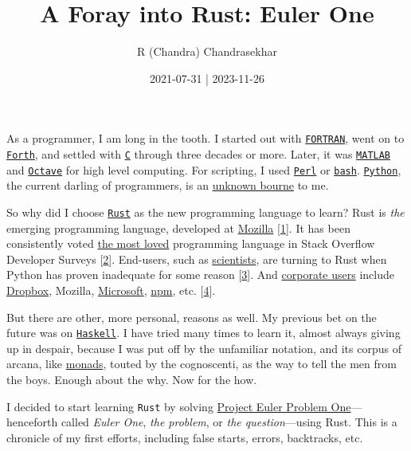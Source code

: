 \documentclass[
  a4paper,
]{article}
\title{A Foray into Rust: Euler One}
\author{R (Chandra) Chandrasekhar}
\date{2021-07-31 | 2023-11-26}
\begin{document}
\maketitle

\thispagestyle{empty}


As a programmer, I am long in the tooth. I started out with
\href{https://fortran-lang.org/}{\texttt{FORTRAN}}, went on to
\href{https://www.forth.com/}{\texttt{Forth}}, and settled with
\href{https://www.iso.org/standard/74528.html}{\texttt{C}} through three
decades or more. Later, it was
\href{https://www.mathworks.com/}{\texttt{MATLAB}} and
\href{https://www.gnu.org/software/octave/index}{\texttt{Octave}} for
high level computing. For scripting, I used
\href{https://www.perl.org/}{\texttt{Perl}} or
\href{https://www.gnu.org/software/bash/}{\texttt{bash}}.
\href{https://www.python.org/}{\texttt{Python}}, the current darling of
programmers, is an
\href{http://www.finedictionary.com/bourn.html}{unknown bourne} to me.

So why did I choose \href{https://www.rust-lang.org/}{\texttt{Rust}} as
the new programming language to learn? Rust is \emph{the} emerging
programming language, developed at
\href{https://research.mozilla.org/rust/}{Mozilla}
{[}\protect\hyperlink{ref-rust}{1}{]}. It has been consistently voted
\href{https://insights.stackoverflow.com/survey/2020\#most-loved-dreaded-and-wanted}{the
most loved} programming language in Stack Overflow Developer Surveys
{[}\protect\hyperlink{ref-goulding2020}{2}{]}. End-users, such as
\href{https://www.nature.com/articles/d41586-020-03382-2}{scientists},
are turning to Rust when Python has proven inadequate for some reason
{[}\protect\hyperlink{ref-perkel2020}{3}{]}. And
\href{https://serokell.io/blog/rust-companies}{corporate users} include
\href{https://www.dropbox.com/}{Dropbox}, Mozilla,
\href{https://www.youtube.com/watch?v=NQBVUjdkLAA}{Microsoft},
\href{https://www.npmjs.com/}{npm}, etc.
{[}\protect\hyperlink{ref-dreimanis2020}{4}{]}.

But there are other, more personal, reasons as well. My previous bet on
the future was on \href{https://www.haskell.org/}{\texttt{Haskell}}. I
have tried many times to learn it, almost always giving up in despair,
because I was put off by the unfamiliar notation, and its corpus of
arcana, like
\href{en.wikipedia.org/wiki/Monad_(functional_programming)}{monads},
touted by the cognoscenti, as the way to tell the men from the boys.
Enough about the why. Now for the how.

I decided to start learning \texttt{Rust} by solving
\href{https://projecteuler.net/problem=1}{Project Euler Problem
One}---henceforth called \emph{Euler One}, \emph{the problem}, or
\emph{the question}---using Rust. This is a chronicle of my first
efforts, including false starts, errors, backtracks, etc.
\end{document}
